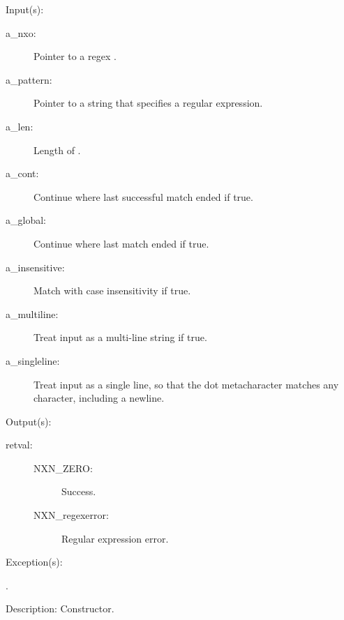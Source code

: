 \begin{capi}
\label{nxo_regex_new}
	\begin{capilist}
	\item[Input(s): ]
		\begin{description}\item[]
		\item[a\_nxo: ]
			Pointer to a regex .
		\item[a\_pattern: ]
			Pointer to a string that specifies a regular expression.
		\item[a\_len: ]
			Length of .
		\item[a\_cont: ]
			Continue where last successful match ended if true.
		\item[a\_global: ]
			Continue where last match ended if true.
		\item[a\_insensitive: ]
			Match with case insensitivity if true.
		\item[a\_multiline: ]
			Treat input as a multi-line string if true.
		\item[a\_singleline: ]
			Treat input as a single line, so that the dot
			metacharacter matches any character, including a
			newline.
		\end{description}
	\item[Output(s): ]
		\begin{description}\item[]
		\item[retval: ]
			\begin{description}\item[]
			\item[NXN\_ZERO: ] Success.
			\item[NXN\_regexerror: ] Regular expression error.
			\end{description}
		\end{description}
	\item[Exception(s): ]
		\begin{description}\item[]
		\item[.]
		\end{description}
	\item[Description: ]
		Constructor.
	\end{capilist}

\end{capi}
